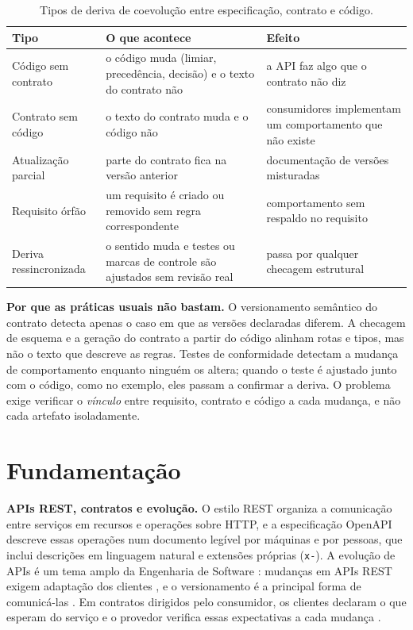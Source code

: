 \documentclass[12pt]{article}
\newcommand{\code}[1]{\texttt{#1}}
\begin{document}
\begin{table}[!ht]
\centering
\caption{Tipos de deriva de coevolução entre especificação, contrato e código.}
\label{tab:tipos_deriva}
\small
\begin{tabularx}{\linewidth}{l X X}
\toprule
\textbf{Tipo} & \textbf{O que acontece} & \textbf{Efeito} \\
\midrule
Código sem contrato & o código muda (limiar, precedência, decisão) e o texto do contrato não & a API faz algo que o contrato não diz \\
Contrato sem código & o texto do contrato muda e o código não & consumidores implementam um comportamento que não existe \\
Atualização parcial & parte do contrato fica na versão anterior & documentação de versões misturadas \\
Requisito órfão & um requisito é criado ou removido sem regra correspondente & comportamento sem respaldo no requisito \\
Deriva ressincronizada & o sentido muda e testes ou marcas de controle são ajustados sem revisão real & passa por qualquer checagem estrutural \\
\bottomrule
\end{tabularx}
\end{table}

\textbf{Por que as práticas usuais não bastam.} O versionamento semântico do contrato detecta apenas o caso em que as versões declaradas diferem. A checagem de esquema e a geração do contrato a partir do código alinham rotas e tipos, mas não o texto que descreve as regras. Testes de conformidade detectam a mudança de comportamento enquanto ninguém os altera; quando o teste é ajustado junto com o código, como no exemplo, eles passam a confirmar a deriva. O problema exige verificar o \textit{vínculo} entre requisito, contrato e código a cada mudança, e não cada artefato isoladamente.

\section{Fundamentação}
\label{sec3:fundamentacao}

\textbf{APIs REST, contratos e evolução.} O estilo REST \cite{fielding2000rest} organiza a comunicação entre serviços em recursos e operações sobre HTTP, e a especificação OpenAPI \cite{openapi303} descreve essas operações num documento legível por máquinas e por pessoas, que inclui descrições em linguagem natural e extensões próprias (\code{x-}). A evolução de APIs é um tema amplo da Engenharia de Software \cite{lamothe2021apievolution}: mudanças em APIs REST exigem adaptação dos clientes \cite{wang2014restevolution}, e o versionamento é a principal forma de comunicá-las \cite{serbout2023versioning}. Em contratos dirigidos pelo consumidor, os clientes declaram o que esperam do serviço e o provedor verifica essas expectativas a cada mudança \cite{robinson2006cdc}.
\end{document}

